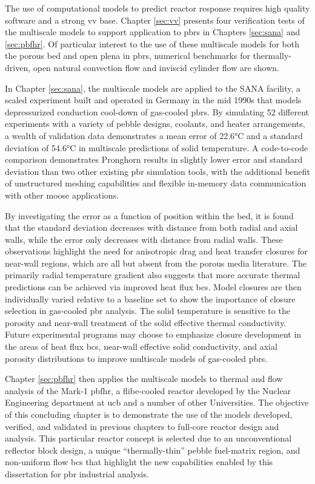 The use of computational models to predict reactor response requires high quality software and a strong \gls{vv} base. Chapter \ref{sec:vv} presents four verification tests of the multiscale models to support application to \glspl{pbr} in Chapters \ref{sec:sana} and \ref{sec:pbfhr}. Of particular interest to the use of these multiscale models for both the porous bed and open plena in \glspl{pbr}, numerical benchmarks for thermally-driven, open natural convection flow and inviscid cylinder flow are shown. %

In Chapter \ref{sec:sana}, the multiscale models are applied to the SANA facility, a scaled experiment built and operated in Germany in the mid 1990s that models depressurized conduction cool-down of gas-cooled \glspl{pbr}. By simulating 52 different experiments with a variety of pebble designs, coolants, and heater arrangements, a wealth of validation data demonstrates a mean error of 22.6\si{\celsius} and a standard deviation of 54.6\si{\celsius} in multiscale predictions of solid temperature. A code-to-code comparison demonstrates Pronghorn results in slightly lower error and standard deviation than two other existing \gls{pbr} simulation tools, with the additional benefit of unstructured meshing capabilities and flexible in-memory data communication with other \gls{moose} applications.

By investigating the error as a function of position within the bed, it is found that the standard deviation decreases with distance from both radial and axial walls, while the error only decreases with distance from radial walls. These observations highlight the need for anisotropic drag and heat transfer closures for near-wall regions, which are all but absent from the porous media literature. The primarily radial temperature gradient also suggests that more accurate thermal predictions can be achieved via improved heat flux \glspl{bc}. Model closures are then individually varied relative to a baseline set to show the importance of closure selection in gas-cooled \gls{pbr} analysis. The solid temperature is sensitive to the porosity and near-wall treatment of the solid effective thermal conductivity. Future experimental programs may choose to emphasize closure development in the areas of heat flux \glspl{bc}, near-wall effective solid conductivity, and axial porosity distributions to improve multiscale models of gas-cooled \glspl{pbr}.

Chapter \ref{sec:pbfhr} then applies the multiscale models to thermal and flow analysis of the Mark-1 \gls{pbfhr}, a \gls{flibe}-cooled reactor developed by the Nuclear Engineering department at \gls{ucb} and a number of other Universities. The objective of this concluding chapter is to demonstrate the use of the models developed, verified, and validated in previous chapters to full-core reactor design and analysis. This particular reactor concept is selected due to an unconventional reflector block design, a unique ``thermally-thin'' pebble fuel-matrix region, and non-uniform flow \glspl{bc} that highlight the new capabilities enabled by this dissertation for \gls{pbr} industrial analysis.

